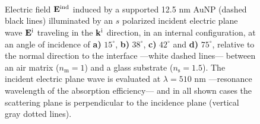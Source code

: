 \begin{figure}[h!]\centering
   \def\svgwidth{.75\textwidth}
   \footnotesize
   \\[-32.6em]
   \hspace*{-.25\textwidth}
       \begin{subfigure}{.25\textwidth}\textcolor{red}{\caption{ } \label{sfig:Near:SuppObl:s:15}}\end{subfigure}%
       \begin{subfigure}{.34\textwidth}\caption{ }\label{sfig:Near:SuppObl:s:38}\end{subfigure}\\[13em]
    \hspace*{-.25\textwidth}
       \begin{subfigure}{.25\textwidth}\textcolor{red}{\caption{ } \label{sfig:Near:SuppObl:s:42}}\end{subfigure}%
       \begin{subfigure}{.34\textwidth}\caption{ }\label{sfig:Near:SuppObl:s:75}\end{subfigure}\\[15em]
\caption[Induced Electric Field of a 12.5 nm Au NP on substrate illuminated at oblique incidence with a $s$ polarized electric field]{%
Electric field $\vb{E}^\text{ind}$ induced by a supported 12.5 nm AuNP (dashed black lines) illuminated by an $s$ polarized incident electric plane wave $\vb{E}^\text{i}$ traveling in the $\vb{k}^\text{i}$ direction, in an internal configuration, at an angle of incidence of \textbf{a)} $15^\circ$, \textbf{b)} $38^\circ$, \textbf{c)} $42^\circ$ and \textbf{d)} $75^\circ$, relative to the normal direction to the interface ---white dashed lines--- between an air matrix ($n_\text{m} = 1$) and a glass substrate ($n_\text{s} = 1.5$). The incident electric plane wave is evaluated at $\lambda = 510$ nm ---resonance wavelength of the absorption efficiency--- and in all shown cases the scattering plane is perpendicular to the incidence plane (vertical gray dotted lines).
}
 \label{fig:Near:SuppObl:s}
 \end{figure}


